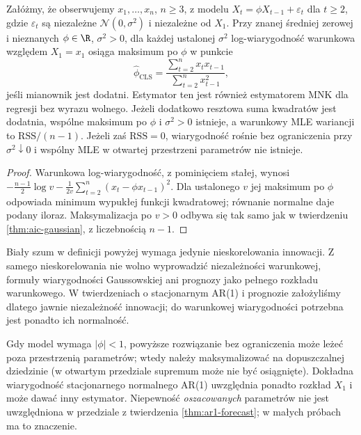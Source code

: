 \begin{stwierdzenie}
\label{prop:ar1-conditional-mle}
Załóżmy, że obserwujemy $x_1,\ldots,x_n$, $n\ge3$,
z modelu $X_t=\phi X_{t-1}+\varepsilon_t$ dla $t\ge2$,
gdzie $\varepsilon_t$ są niezależne
$\mathcal N(0,\sigma^2)$ i niezależne od $X_1$.
Przy znanej średniej zerowej i nieznanych
$\phi\in\R$, $\sigma^2>0$, dla każdej ustalonej
$\sigma^2$ log-wiarygodność warunkowa względem $X_1=x_1$
osiąga maksimum po $\phi$ w punkcie
\[
 \widehat\phi_{\mathrm{CLS}}=
 \frac{\sum_{t=2}^n x_tx_{t-1}}{\sum_{t=2}^n x_{t-1}^2},
\]
jeśli mianownik jest dodatni. Estymator ten jest
również estymatorem MNK dla regresji bez wyrazu wolnego.
Jeżeli dodatkowo resztowa suma kwadratów jest dodatnia,
wspólne maksimum po $\phi$ i $\sigma^2>0$ istnieje,
a warunkowy MLE wariancji to $\mathrm{RSS}/(n-1)$.
Jeżeli zaś $\mathrm{RSS}=0$, wiarygodność rośnie
bez ograniczenia przy $\sigma^2\downarrow0$ i wspólny MLE
w otwartej przestrzeni parametrów nie istnieje.
\end{stwierdzenie}
\begin{proof}
Warunkowa log-wiarygodność, z pominięciem stałej,
wynosi $-\frac{n-1}{2}\log v-
\frac{1}{2v}\sum_{t=2}^n(x_t-\phi x_{t-1})^2$.
Dla ustalonego $v$ jej maksimum po $\phi$ odpowiada
minimum wypukłej funkcji kwadratowej; równanie
normalne daje podany iloraz. Maksymalizacja po
$v>0$ odbywa się tak samo jak w twierdzeniu
\ref{thm:aic-gaussian}, z liczebnością $n-1$.
\end{proof}

\begin{uwaga}
Biały szum w definicji powyżej wymaga jedynie nieskorelowania
innowacji. Z samego nieskorelowania nie wolno wyprowadzić
niezależności warunkowej, formuły wiarygodności Gaussowskiej
ani prognozy jako pełnego rozkładu warunkowego. W twierdzeniach
o stacjonarnym AR(1) i prognozie założyliśmy dlatego
jawnie niezależność innowacji; do warunkowej wiarygodności
potrzebna jest ponadto ich normalność.
\end{uwaga}

\begin{uwaga}
Gdy model wymaga $|\phi|<1$, powyższe rozwiązanie
bez ograniczenia może leżeć poza przestrzenią parametrów;
wtedy należy maksymalizować na dopuszczalnej dziedzinie
(w otwartym przedziale supremum może nie być osiągnięte).
Dokładna wiarygodność stacjonarnego normalnego AR(1)
uwzględnia ponadto rozkład $X_1$ i może dawać inny
estymator. Niepewność \emph{oszacowanych} parametrów
nie jest uwzględniona w przedziale z twierdzenia
\ref{thm:ar1-forecast}; w małych próbach ma to znaczenie.
\end{uwaga}

